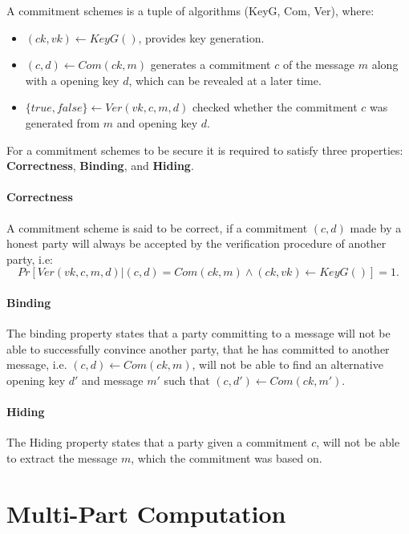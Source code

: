 \begin{definition}
A commitment schemes is a tuple of algorithms (KeyG, Com, Ver), where:
\begin{itemize}
  \item $(ck, vk) \leftarrow KeyG()$, provides key generation.
  \item $(c, d) \leftarrow Com(ck, m)$ generates a commitment $c$ of the message
    $m$ along with a opening key $d$, which can be revealed at a later time.
  \item $\{true, false\} \leftarrow Ver(vk, c, m, d)$ checked whether the
    commitment $c$ was generated from $m$ and opening key $d$.
\end{itemize}
\end{definition}

For a commitment schemes to be secure it is required to satisfy three
properties: \textbf{Correctness}, \textbf{Binding}, and \textbf{Hiding}.

\paragraph{Correctness}
A commitment scheme is said to be correct, if a commitment $(c, d)$ made by a
honest party will always be accepted by the verification procedure of another
party, i.e:
$$
Pr[Ver(vk, c, m, d) | (c, d) = Com(ck, m) \land (ck, vk) \leftarrow KeyG()] = 1.
$$

\paragraph{Binding}
The binding property states that a party committing to a message will not be
able to successfully convince another party, that he has committed to another
message, i.e. $(c, d) \leftarrow Com(ck, m)$, will not be able to find an alternative opening key $d'$
and message $m'$ such that $(c, d') \leftarrow Com(ck, m')$.




\paragraph{Hiding}
The Hiding property states that a party given a commitment $c$, will not be able
to extract the message $m$, which the commitment was based on.

\section{Multi-Part Computation}
\label{sec:background:mpc}



